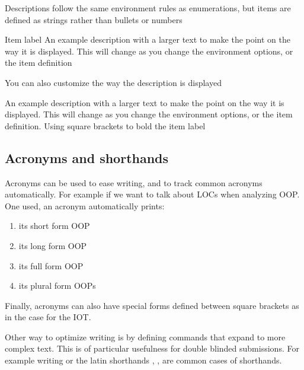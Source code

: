 Descriptions follow the same environment rules as enumerations, but items are defined as strings rather than bullets or numbers

\begin{description}
  \item{Item label} An example description with a larger text to make the point on the way it is displayed. This will change as you change the environment options, or the item definition
\end{description}

You can also customize the way the description is displayed
\begin{description}[labelindent=1cm]
  \item[Item label] An example description with a larger text to make the point on the way it is displayed. This will change as you change the environment options, or the item definition. Using square brackets to bold the item label 
\end{description}


\subsection{Acronyms and shorthands}
\label{sec:acrosnyms}

Acronyms can be used to ease writing, and to track common acronyms automatically. For example if we want to talk about \acp{LOC} when analyzing \ac{OOP}. One used, an acronym automatically prints:
\begin{enumerate}
  \item its short form \ac{OOP}
  \item its long form \acl{OOP}
  \item its full form \acf{OOP}
  \item its plural form \acp{OOP}
\end{enumerate}

Finally, acronyms can also have special forms defined between square brackets as in the case for the \ac{IOT}. 

Other way to optimize writing is by defining commands that expand to more complex text. This is of particular usefulness for double blinded submissions. For example writing \js or the latin shorthands \ie, \eg, \cf are common cases of shorthands.



\endinput